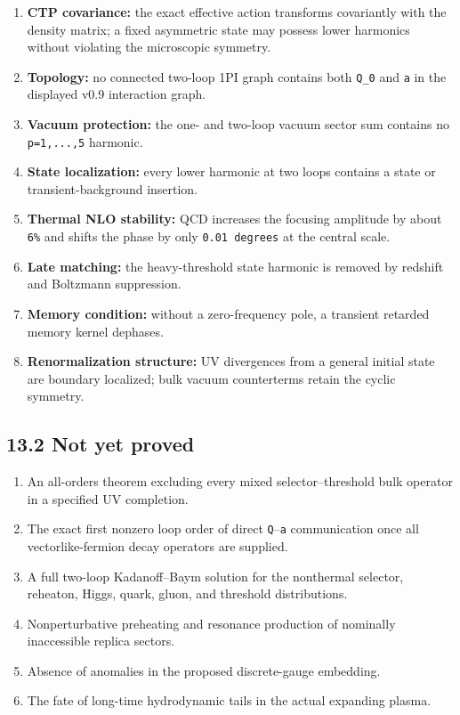 \documentclass[
  10pt,
  a4paper,
]{article}
\providecommand{\tightlist}{%
  \setlength{\itemsep}{0pt}\setlength{\parskip}{0pt}}
\begin{document}
\begin{enumerate}
\def\labelenumi{\arabic{enumi}.}
\tightlist
\item
  \textbf{CTP covariance:} the exact effective action transforms
  covariantly with the density matrix; a fixed asymmetric state may
  possess lower harmonics without violating the microscopic symmetry.
\item
  \textbf{Topology:} no connected two-loop 1PI graph contains both
  \texttt{Q\_0} and \texttt{a} in the displayed v0.9 interaction graph.
\item
  \textbf{Vacuum protection:} the one- and two-loop vacuum sector sum
  contains no \texttt{p=1,...,5} harmonic.
\item
  \textbf{State localization:} every lower harmonic at two loops
  contains a state or transient-background insertion.
\item
  \textbf{Thermal NLO stability:} QCD increases the focusing amplitude
  by about \texttt{6\%} and shifts the phase by only
  \texttt{0.01\ degrees} at the central scale.
\item
  \textbf{Late matching:} the heavy-threshold state harmonic is removed
  by redshift and Boltzmann suppression.
\item
  \textbf{Memory condition:} without a zero-frequency pole, a transient
  retarded memory kernel dephases.
\item
  \textbf{Renormalization structure:} UV divergences from a general
  initial state are boundary localized; bulk vacuum counterterms retain
  the cyclic symmetry.
\end{enumerate}

\subsection{13.2 Not yet proved}\label{not-yet-proved}

\begin{enumerate}
\def\labelenumi{\arabic{enumi}.}
\tightlist
\item
  An all-orders theorem excluding every mixed selector--threshold bulk
  operator in a specified UV completion.
\item
  The exact first nonzero loop order of direct \texttt{Q}--\texttt{a}
  communication once all vectorlike-fermion decay operators are
  supplied.
\item
  A full two-loop Kadanoff--Baym solution for the nonthermal selector,
  reheaton, Higgs, quark, gluon, and threshold distributions.
\item
  Nonperturbative preheating and resonance production of nominally
  inaccessible replica sectors.
\item
  Absence of anomalies in the proposed discrete-gauge embedding.
\item
  The fate of long-time hydrodynamic tails in the actual expanding
  plasma.
\end{enumerate}
\end{document}
